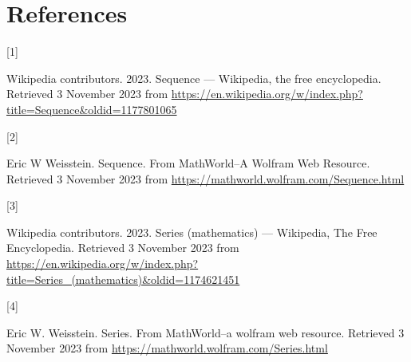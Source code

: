 \documentclass[
  a4paper,
]{article}
\newlength{\cslhangindent}
\newlength{\csllabelwidth}
\newlength{\cslentryspacingunit} %
\newenvironment{CSLReferences}[2] %
 {%
  \setlength{\parindent}{0pt}
  \ifodd #1
  \let\oldpar\par
  \def\par{\hangindent=\cslhangindent\oldpar}
  \fi
  \setlength{\parskip}{#2\cslentryspacingunit}
 }%
 {}
\newcommand{\CSLLeftMargin}[1]{\parbox[t]{\csllabelwidth}{#1}}
\newcommand{\CSLRightInline}[1]{\parbox[t]{\linewidth - \csllabelwidth}{#1}\break}
\begin{document}
\hypertarget{bibliography}{%
\section*{References}\label{bibliography}}

\hypertarget{refs}{}
\begin{CSLReferences}{0}{0}
\leavevmode{}%
\CSLLeftMargin{{[}1{]} }%
\CSLRightInline{Wikipedia contributors. 2023. Sequence ---
{Wikipedia}{,} the free encyclopedia. Retrieved 3 November 2023 from
\url{https://en.wikipedia.org/w/index.php?title=Sequence\&oldid=1177801065}}

\leavevmode{}%
\CSLLeftMargin{{[}2{]} }%
\CSLRightInline{Eric W Weisstein. {Sequence. From MathWorld--A Wolfram
Web Resource}. Retrieved 3 November 2023 from
\url{https://mathworld.wolfram.com/Sequence.html}}

\leavevmode{}%
\CSLLeftMargin{{[}3{]} }%
\CSLRightInline{Wikipedia contributors. 2023. {Series (mathematics) ---
{Wikipedia}{,} The Free Encyclopedia}. Retrieved 3 November 2023 from
\url{https://en.wikipedia.org/w/index.php?title=Series_(mathematics)\&oldid=1174621451}}

\leavevmode{}%
\CSLLeftMargin{{[}4{]} }%
\CSLRightInline{Eric W. Weisstein. Series. From MathWorld--a wolfram web
resource. Retrieved 3 November 2023 from
\url{https://mathworld.wolfram.com/Series.html}}

\end{CSLReferences}
\end{document}
